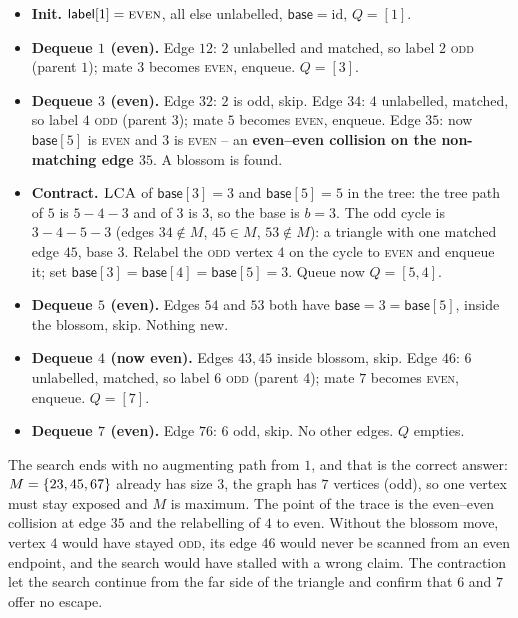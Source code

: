 \begin{itemize}
\item \textbf{Init.} $\textsf{label}[1]=\textsc{even}$, all else unlabelled,
$\textsf{base}=\mathrm{id}$, $Q=[1]$.
\item \textbf{Dequeue $1$ (even).} Edge $12$: $2$ unlabelled and matched, so label $2$ \textsc{odd}
(parent $1$); mate $3$ becomes \textsc{even}, enqueue. $Q=[3]$.
\item \textbf{Dequeue $3$ (even).} Edge $32$: $2$ is odd, skip. Edge $34$: $4$ unlabelled, matched, so
label $4$ \textsc{odd} (parent $3$); mate $5$ becomes \textsc{even}, enqueue. Edge $35$: now
$\textsf{base}[5]$ is \textsc{even} and $3$ is \textsc{even} -- an \textbf{even--even collision on the
non-matching edge $35$}. A blossom is found.
\item \textbf{Contract.} $\textsc{LCA}$ of $\textsf{base}[3]=3$ and $\textsf{base}[5]=5$ in the tree:
the tree path of $5$ is $5\!-\!4\!-\!3$ and of $3$ is $3$, so the base is $b=3$. The odd cycle is
$3\!-\!4\!-\!5\!-\!3$ (edges $34\notin M$, $45\in M$, $53\notin M$): a triangle with one matched edge
$45$, base $3$. Relabel the \textsc{odd} vertex $4$ on the cycle to \textsc{even} and enqueue it; set
$\textsf{base}[3]=\textsf{base}[4]=\textsf{base}[5]=3$. Queue now $Q=[5,4]$.
\item \textbf{Dequeue $5$ (even).} Edges $54$ and $53$ both have $\textsf{base}=3=\textsf{base}[5]$,
inside the blossom, skip. Nothing new.
\item \textbf{Dequeue $4$ (now even).} Edges $43,45$ inside blossom, skip. Edge $46$: $6$ unlabelled,
matched, so label $6$ \textsc{odd} (parent $4$); mate $7$ becomes \textsc{even}, enqueue. $Q=[7]$.
\item \textbf{Dequeue $7$ (even).} Edge $76$: $6$ odd, skip. No other edges. $Q$ empties.
\end{itemize}

The search ends with no augmenting path from $1$, and that is the correct answer:
$M=\{23,45,67\}$ already has size $3$, the graph has $7$ vertices (odd), so one vertex must stay
exposed and $M$ is maximum. The point of the trace is the even--even collision at edge $35$ and the
relabelling of $4$ to even. Without the blossom move, vertex $4$ would have stayed \textsc{odd},
its edge $46$ would never be scanned from an even endpoint, and the search would have stalled with a
wrong claim. The contraction let the search continue from the far side of the triangle and confirm
that $6$ and $7$ offer no escape.

